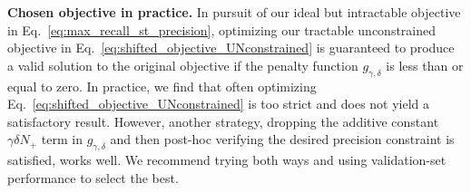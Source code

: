 \textbf{Chosen objective in practice.}
In pursuit of our ideal but intractable objective in Eq.~\eqref{eq:max_recall_st_precision}, optimizing our tractable unconstrained objective in Eq.~\eqref{eq:shifted_objective_UNconstrained} is guaranteed to produce a valid solution to the original objective if the penalty function $g_{\gamma,\delta}$ is less than or equal to zero. 
In practice, we find that often optimizing Eq.~\eqref{eq:shifted_objective_UNconstrained} is too strict and does not yield a satisfactory result. 
However, another strategy, dropping the additive constant $\gamma \delta N_+$ term in $g_{\gamma,\delta}$ and then post-hoc verifying the desired precision constraint is satisfied, works well. 
We recommend trying both ways and using validation-set performance to select the best.